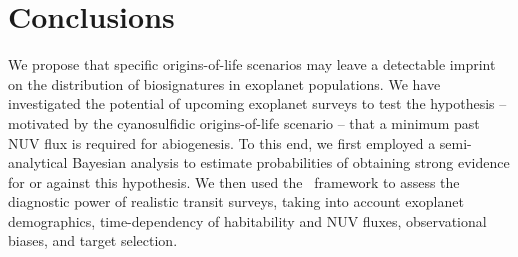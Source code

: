 \documentclass[twocolumn,twocolappendix,linenumbers]{aastex631}
\begin{document}

\section{Conclusions}
\label{sec:conclusions}
We propose that specific origins-of-life scenarios may leave a detectable imprint on the distribution of biosignatures in exoplanet populations.
We have investigated the potential of upcoming exoplanet surveys to test the hypothesis -- motivated by the cyanosulfidic origins-of-life scenario -- that a minimum past \gls{NUV} flux is required for abiogenesis.
To this end, we first employed a semi-analytical Bayesian analysis to estimate probabilities of obtaining strong evidence for or against this hypothesis.
We then used the \bioverse\ framework to assess the diagnostic power of realistic transit surveys, taking into account exoplanet demographics, time-dependency of habitability and \gls{NUV} fluxes, observational biases, and target selection.
\end{document}
